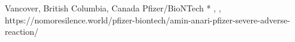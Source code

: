           {
            Vancover, British Columbia, Canada
          }
          {
          }
          {
            Pfizer/BioNTech
          }
          {
            *
          }
          {
            ,
            ,
          }
          {
            https://nomoresilence.world/pfizer-biontech/amin-anari-pfizer-severe-adverse-reaction/
          }

